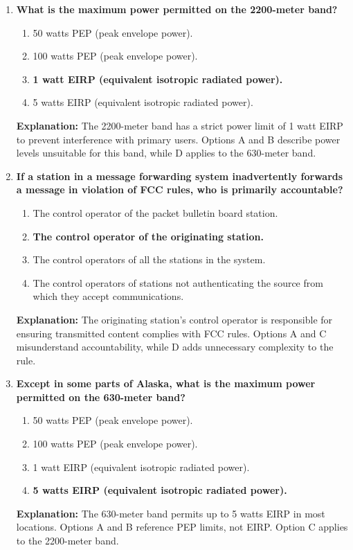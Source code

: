 \begin{enumerate}
    \item \textbf{What is the maximum power permitted on the 2200-meter band?}
    \begin{enumerate}
        \item 50 watts PEP (peak envelope power).\\
        \item 100 watts PEP (peak envelope power).\\
        \item \textbf{1 watt EIRP (equivalent isotropic radiated power).}\\
        \item 5 watts EIRP (equivalent isotropic radiated power).
    \end{enumerate}
    \textbf{Explanation:} The 2200-meter band has a strict power limit of 1 watt EIRP to prevent interference with primary users. Options A and B describe power levels unsuitable for this band, while D applies to the 630-meter band.

    \item \textbf{If a station in a message forwarding system inadvertently forwards a message in violation of FCC rules, who is primarily accountable?}
    \begin{enumerate}
        \item The control operator of the packet bulletin board station.\\
        \item \textbf{The control operator of the originating station.}\\
        \item The control operators of all the stations in the system.\\
        \item The control operators of stations not authenticating the source from which they accept communications.
    \end{enumerate}
    \textbf{Explanation:} The originating station’s control operator is responsible for ensuring transmitted content complies with FCC rules. Options A and C misunderstand accountability, while D adds unnecessary complexity to the rule.

    \item \textbf{Except in some parts of Alaska, what is the maximum power permitted on the 630-meter band?}
    \begin{enumerate}
        \item 50 watts PEP (peak envelope power).\\
        \item 100 watts PEP (peak envelope power).\\
        \item 1 watt EIRP (equivalent isotropic radiated power).\\
        \item \textbf{5 watts EIRP (equivalent isotropic radiated power).}
    \end{enumerate}
    \textbf{Explanation:} The 630-meter band permits up to 5 watts EIRP in most locations. Options A and B reference PEP limits, not EIRP. Option C applies to the 2200-meter band.


\end{enumerate}
